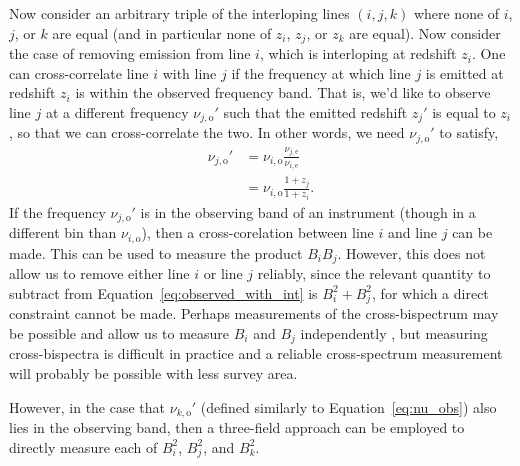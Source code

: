 \documentclass{aastex62}
\newcommand{\beq}{\begin{equation}}
\newcommand{\eeq}{\end{equation}}
\newcommand{\mynu}[2]{\ensuremath{\nu_{#1,\text{#2}}}}
\begin{document}
Now consider an arbitrary triple of the interloping lines $(i, j, k)$ where
none of $i$, $j$, or $k$ are equal (and in particular none of $z_i$, $z_j$, or
$z_k$ are equal). Now consider the case of removing emission from line $i$,
which is interloping at redshift $z_i$. One can cross-correlate line $i$ with
line $j$ if the frequency at which line $j$ is emitted at redshift $z_i$ is
within the observed frequency band. That is, we'd like to observe line $j$ at
a different frequency $\mynu{j}{o}'$ such that the emitted redshift $z_j'$ is
equal to $z_i$, so that we can cross-correlate the two. In other words, we
need $\mynu{j}{o}'$ to satisfy,
\beq\label{eq:nu_obs}
\begin{split}
\mynu{j}{o}' &= \mynu{i}{o} \frac{\mynu{j}{e}}{\mynu{i}{e}} \\
&= \mynu{i}{o} \frac{1+z_j}{1+z_i}\text{.}
\end{split}
\eeq
If the frequency $\mynu{j}{o}'$ is in the observing band of an instrument
(though in a different bin than $\mynu{i}{o}$), then a cross-corelation
between line $i$ and line $j$ can be made. This can be used to measure the
product $B_iB_j$. However, this does not allow us to remove either line $i$ or
line $j$ reliably, since the relevant quantity to subtract from
Equation~\ref{eq:observed_with_int} is $B_i^2 + B_j^2$, for which a direct
constraint cannot be made. Perhaps measurements of the cross-bispectrum may be
possible and allow us to measure $B_i$ and $B_j$ independently
\citep{2018ApJ...867...26B}, but measuring cross-bispectra is difficult in
practice and a reliable cross-spectrum measurement will probably be possible
with less survey area.

However, in the case that $\mynu{k}{o}'$ (defined similarly to
Equation~\ref{eq:nu_obs}) also lies in the observing band, then a three-field
approach can be employed to directly measure each of $B_i^2$, $B_j^2$, and
$B_k^2$.



\end{document}
